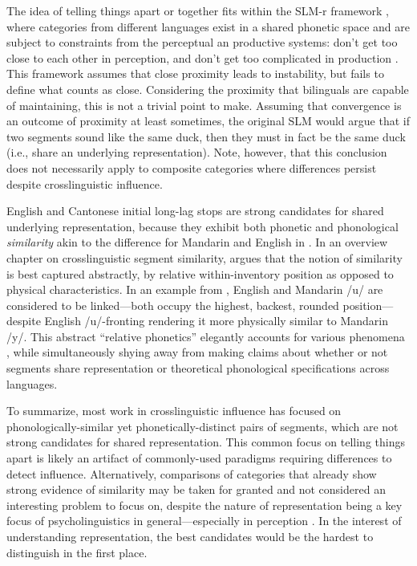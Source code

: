 The idea of telling things apart or together fits within the SLM-r framework \citep{flege_2021_slmr}, where categories from different languages exist in a shared phonetic space and are subject to constraints from the perceptual an productive systems: don't get too close to each other in perception, and don't get too complicated in production \citep{guion_2003_systems,lindblom_1988_universals, flege_1995_slm}. This framework assumes that close proximity leads to instability, but fails to define what counts as close. Considering the proximity that bilinguals are capable of maintaining, this is not a trivial point to make. Assuming that convergence is an outcome of proximity at least sometimes, the original SLM would argue that if two segments sound like the same duck, then they must in fact be the same duck (i.e., share an underlying representation). Note, however, that this conclusion does not necessarily apply to composite categories where differences persist despite crosslinguistic influence.
 
English and Cantonese initial long-lag stops are strong candidates for shared underlying representation, because they exhibit both phonetic and phonological \textit{similarity} akin to the difference for Mandarin and English in \citep{yang_2019_vot}. In an overview chapter on crosslinguistic segment similarity, \citep{chang_2015_similarity} argues that the notion of similarity is best captured abstractly, by relative within-inventory position as opposed to physical characteristics. In an example from \citep{chang_2015_similarity}, English and Mandarin /u/ are considered to be linked---both occupy the highest, backest, rounded position---despite English /u/-fronting rendering it more physically similar to Mandarin /y/. This abstract ``relative phonetics'' elegantly accounts for various phenomena \citep{chang_2015_similarity}, while simultaneously shying away from making claims about whether or not segments share representation or theoretical phonological specifications across languages. 

To summarize, most work in crosslinguistic influence has focused on phonologically-similar yet phonetically-distinct pairs of segments, which are not strong candidates for shared representation. This common focus on telling things apart is likely an artifact of commonly-used paradigms requiring differences to detect influence. Alternatively, comparisons of categories that already show strong evidence of similarity may be taken for granted and not considered an interesting problem to focus on, despite the nature of representation being a key focus of psycholinguistics in general---especially in perception \citep{samuel_2020_resist}. In the interest of understanding representation, the best candidates would be the hardest to distinguish in the first place. 

